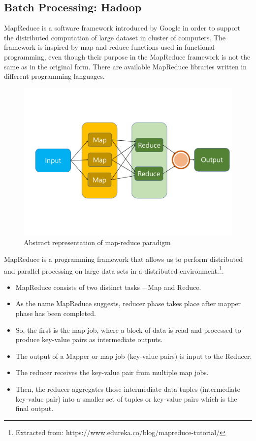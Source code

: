 \subsection{Batch Processing: Hadoop}\label{sec:map_reduce_hadoop}
MapReduce is a software framework introduced by Google in order to support the distributed computation of large dataset in cluster of computers. The framework is inspired by map and reduce functions used in functional programming, even though their purpose in the MapReduce framework is not the same as in the original form.
There are available MapReduce libraries written in different programming languages. 
\begin{figure}
	\centering
	\includegraphics[width=\columnwidth]{Images/map_reduce_1.pdf}  
	\caption[map-reduce model]{Abstract representation of map-reduce paradigm}
	\label{fig:mapReduce}
\end{figure}

MapReduce is a programming framework that allows us to perform distributed and parallel processing on large data sets in a distributed environment.\footnote{Extracted from: https://www.edureka.co/blog/mapreduce-tutorial/}.
\begin{itemize}
	\item MapReduce consists of two distinct tasks – Map and Reduce.
	\item As the name MapReduce suggests, reducer phase takes place after mapper phase has been completed.
	\item So, the first is the map job, where a block of data is read and processed to produce key-value pairs as intermediate outputs.
	\item The output of a Mapper or map job (key-value pairs) is input to the Reducer.
	\item The reducer receives the key-value pair from multiple map jobs.
	\item Then, the reducer aggregates those intermediate data tuples (intermediate key-value pair) into a smaller set of tuples or key-value pairs which is the final output.
\end{itemize}


